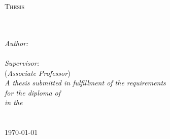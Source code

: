 \documentclass[
11pt, %
onehalfspacing, %
headsepline, %
]{MastersDoctoralThesis} %
\author{Filippos Christianos} %
\begin{document}
\frontmatter %

\pagestyle{plain} %


\begin{titlepage}
\begin{center}
	



{\scshape\LARGE \univname\par}\vspace{1.5cm} %
\textsc{\Large Thesis}\\[0.5cm] %

\HRule \\[0.4cm] %
{\huge \bfseries \ttitle\par}\vspace{0.4cm} %
\HRule \\[1.5cm] %
 
\emph{Author:}\\
{\authorname}\\ %
\emph{Supervisor:} \\
{\supname} ({\em Associate Professor})\\ %
 \vspace{30pt}
\large \textit{A thesis submitted in fulfillment of the requirements\\ for the diploma of \degreename}\\[0.3cm] %
\textit{in the}\\[0.4cm]
\deptname\\\univname\\[2cm] %
 
{\large \today}\\[4cm] %
 
\vfill
\end{center}
\end{titlepage}

\end{document}
